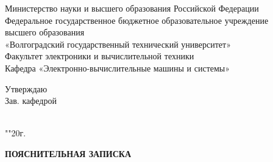 \pagestyle{empty}

\begin{nospasing}
	\begin{center}
		Министерство науки и высшего образования Российской Федерации \\
		Федеральное государственное бюджетное образовательное учреждение \\
		высшего образования \\
		«Волгоградский государственный технический университет» \\
		Факультет электроники и вычислительной техники \\
		Кафедра «Электронно-вычислительные машины и системы» \\
	\end{center}
\end{nospasing}

\hfill
\begin{minipage}[t]{0.4\linewidth}
	Утверждаю \\
	Зав. кафедрой \\
	  \\
	
	\smallskip
	
	"\underline{\hspace*{.7cm}}"{}\underline{\hspace*{3cm}}20\underline{\hspace*{.7cm}}г.
\end{minipage}

\bigskip
\bigskip
\bigskip

\begin{center}
	\textbf{ПОЯСНИТЕЛЬНАЯ ЗАПИСКА}
\end{center}

